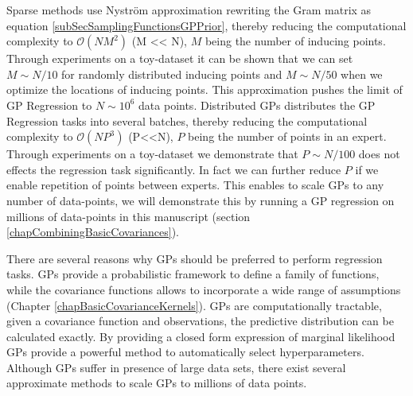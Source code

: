 Sparse methods use Nystr\"{o}m approximation rewriting the Gram matrix as equation \ref{subSecSamplingFunctionsGPPrior}, thereby reducing the computational complexity to $\mathcal{O}(NM^{2})$ (M << N), $M$ being the number of inducing points. Through experiments on a toy-dataset it can be shown that we can set $M \sim N/10$ for randomly distributed inducing points and $M \sim N/50$ when we optimize the locations of inducing points. This approximation pushes the limit of GP Regression to $N \sim 10^6$ data points. Distributed GPs distributes the GP Regression tasks into several batches, thereby reducing the computational complexity to $\mathcal{O}(NP^{3})$ (P<<N), $P$ being the number of points in an expert. Through experiments on a toy-dataset we demonstrate that $P \sim N/100$ does not effects the regression task significantly. In fact we can further reduce $P$ if we enable repetition of points between experts. This enables to scale GPs to any number of data-points, we will demonstrate this by running a GP regression on millions of data-points in this manuscript (section \ref{chapCombiningBasicCovariances}). 

There are several reasons why GPs should be preferred to perform regression tasks. GPs provide a probabilistic framework to define a family of functions, while the covariance functions allows to incorporate a wide range of assumptions (Chapter \ref{chapBasicCovarianceKernels}). GPs are computationally tractable, given a covariance function and observations, the predictive distribution can be calculated exactly. By providing a closed form expression of marginal likelihood GPs provide a powerful method to automatically select hyperparameters. Although GPs suffer in presence of large data sets, there exist several approximate methods to scale GPs to millions of data points. 





